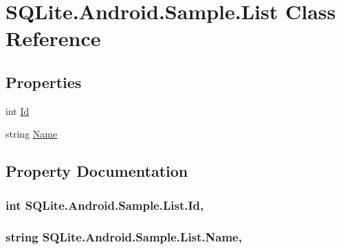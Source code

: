 \hypertarget{class_s_q_lite_1_1_android_1_1_sample_1_1_list}{\section{S\+Q\+Lite.\+Android.\+Sample.\+List Class Reference}
\label{class_s_q_lite_1_1_android_1_1_sample_1_1_list}
}
\subsection*{Properties}
\begin{DoxyCompactItemize}
\item 
int \hyperlink{class_s_q_lite_1_1_android_1_1_sample_1_1_list_ad2510309c85c35313f4a4ffdc74626cd}{Id}
\item 
string \hyperlink{class_s_q_lite_1_1_android_1_1_sample_1_1_list_a339ba52a0a909df6d2d63503bc410806}{Name}
\end{DoxyCompactItemize}


\subsection{Property Documentation}
\hypertarget{class_s_q_lite_1_1_android_1_1_sample_1_1_list_ad2510309c85c35313f4a4ffdc74626cd}{
\subsubsection[{Id}]{\setlength{\rightskip}{0pt plus 5cm}int S\+Q\+Lite.\+Android.\+Sample.\+List.\+Id\hspace{0.3cm}{\ttfamily [get]}, {\ttfamily [set]}}}\label{class_s_q_lite_1_1_android_1_1_sample_1_1_list_ad2510309c85c35313f4a4ffdc74626cd}
\hypertarget{class_s_q_lite_1_1_android_1_1_sample_1_1_list_a339ba52a0a909df6d2d63503bc410806}{
\subsubsection[{Name}]{\setlength{\rightskip}{0pt plus 5cm}string S\+Q\+Lite.\+Android.\+Sample.\+List.\+Name\hspace{0.3cm}{\ttfamily [get]}, {\ttfamily [set]}}}\label{class_s_q_lite_1_1_android_1_1_sample_1_1_list_a339ba52a0a909df6d2d63503bc410806}


